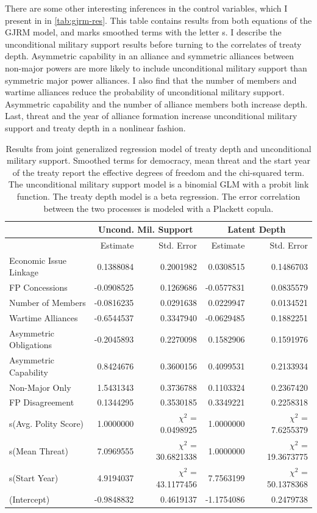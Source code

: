 \documentclass[12pt]{article}
\begin{document}
There are some other interesting inferences in the control variables, which I present in in \autoref{tab:gjrm-res}. 
This table contains results from both equations of the GJRM model, and marks smoothed terms with the letter s. 
I describe the unconditional military support results before turning to the correlates of treaty depth. 
Asymmetric capability in an alliance and symmetric alliances between non-major powers are more likely to include unconditional military support than symmetric major power alliances. 
I also find that the number of members and wartime alliances reduce the probability of unconditional military support. 
Asymmetric capability and the number of alliance members both increase depth. 
Last, threat and the year of alliance formation increase unconditional military support and treaty depth in a nonlinear fashion. 

\begin{table}[ht]
\centering
\begin{tabular}{lrrrr}
  & \multicolumn{2}{c}{Uncond. Mil. Support} & \multicolumn{2}{c}{Latent Depth}\\ \hline
   & Estimate & Std. Error & Estimate & Std. Error \\ 
  \hline
  Economic Issue Linkage & 0.1388084 & 0.2001982 & 0.0308515 & 0.1486703 \\ 
  FP Concessions & -0.0908525 & 0.1269686 & -0.0577831 & 0.0835579 \\ 
  Number of Members & -0.0816235 & 0.0291638 & 0.0229947 & 0.0134521 \\ 
  Wartime Alliances & -0.6544537 & 0.3347940 & -0.0629485 & 0.1882251 \\ 
  Asymmetric Obligations & -0.2045893 & 0.2270098 & 0.1582906 & 0.1591976 \\ 
  Asymmetric Capability & 0.8424676 & 0.3600156 & 0.4099531 & 0.2133934 \\ 
  Non-Major Only & 1.5431343 & 0.3736788 & 0.1103324 & 0.2367420 \\ 
  FP Disagreement & 0.1344295 & 0.3530185 & 0.3349221 & 0.2258318 \\ 
  s(Avg. Polity Score) & 1.0000000 & $\chi^2$ = 0.0498925 & 1.0000000 & $\chi^2$ = 7.6255379 \\ 
  s(Mean Threat) & 7.0969555 & $\chi^2$ = 30.6821338 & 1.0000000 & $\chi^2$ = 19.3673775 \\ 
  s(Start Year) & 4.9194037 & $\chi^2$ = 43.1177456 & 7.7563199 & $\chi^2$ = 50.1378368 \\ 
  (Intercept) & -0.9848832 & 0.4619137 & -1.1754086 & 0.2479738 \\ 
   \hline
\end{tabular}
\caption{Results from joint generalized regression model of treaty depth and unconditional military support. 
          Smoothed terms for democracy, mean threat and the start year of the treaty report the effective degrees of freedom and the chi-squared term. 
                     The unconditional military support model is a binomial GLM with a probit link function. 
                     The treaty depth model is a beta regression. 
                     The error correlation between the two processes is modeled with a Plackett copula.} 
\label{tab:gjrm-res}
\end{table}
\end{document}
